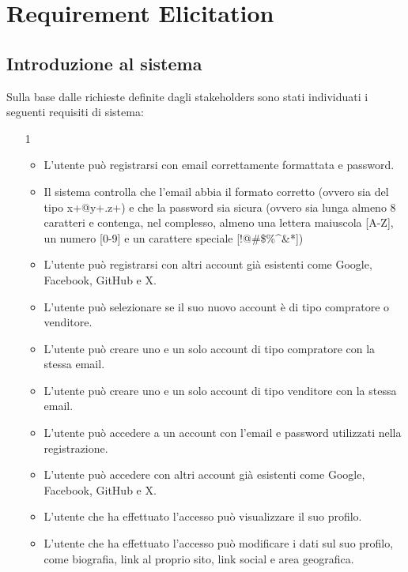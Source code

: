
\chapter{Requirement Elicitation}
     \section{Introduzione al sistema} %
        Sulla base dalle richieste definite dagli stakeholders sono stati individuati i seguenti requisiti di sistema:
        
        \begin{itemize}
            \item[1]
                \begin{itemize}
                    \item L'utente può registrarsi con email correttamente formattata e password.
                    \item Il sistema controlla che l'email abbia il formato corretto (ovvero sia del tipo x+@y+.z+) e che la password sia sicura (ovvero sia lunga almeno 8 caratteri e contenga, nel complesso, almeno una lettera maiuscola [A-Z], un numero [0-9] e un carattere speciale [!@\#\$\%\^{}\&*])
                    \item L'utente può registrarsi con altri account già esistenti come Google, Facebook, GitHub e X.
                    \item L'utente può selezionare se il suo nuovo account è di tipo compratore o venditore.
                    \item L'utente può creare uno e un solo account di tipo compratore con la stessa email.
                    \item L'utente può creare uno e un solo account di tipo venditore con la stessa email.
                    \item L'utente può accedere a un account con l'email e password utilizzati nella registrazione.
                    \item L'utente può accedere con altri account già esistenti come Google, Facebook, GitHub e X.
                    \item L'utente che ha effettuato l'accesso può visualizzare il suo profilo.
                    \item L'utente che ha effettuato l'accesso può modificare i dati sul suo profilo, come biografia, link al proprio sito, link social e area geografica.

\end{itemize}
\end{itemize}
